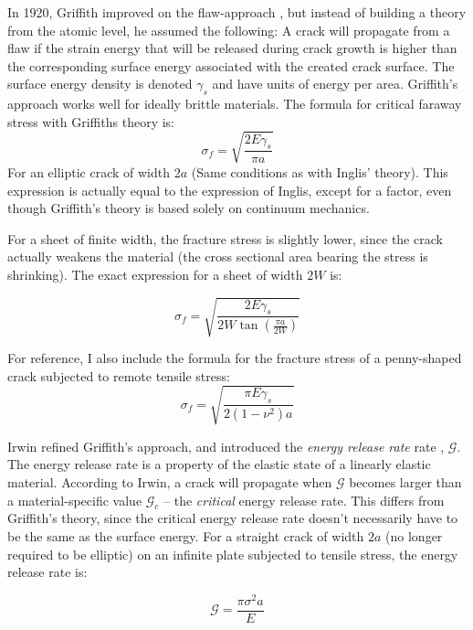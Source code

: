 In 1920, Griffith improved on the flaw-approach \cite{griffith1920phenomena}, but instead of building a theory from the atomic level, he assumed the following: A crack will propagate from a flaw if the strain energy that will be released during crack growth is higher than the corresponding surface energy associated with the created crack surface. The surface energy density is denoted $\gamma_s$ and have units of energy per area. Griffith's approach works well for ideally brittle materials. The formula for critical faraway stress with Griffiths theory is:
\begin{equation}
	\sigma_f = \sqrt{\frac{2E\gamma_s}{\pi a}}
\end{equation}
For an elliptic crack of width $2a$ (Same conditions as with Inglis' theory). This expression is actually equal to the expression of Inglis, except for a factor, even though Griffith's theory is based solely on continuum mechanics.

For a sheet of finite width, the fracture stress is slightly lower, since the crack actually weakens the material (the cross sectional area bearing the stress is shrinking). The exact expression for a sheet of width $2W$ is:

 \begin{equation}
 	\sigma_f = \sqrt{\frac{2E\gamma_s}{2W\tan\left( \frac{\pi a}{2W}\right)}}
 	\label{eq:griffith_finite_sheet}
 \end{equation}

For reference, I also include the formula for the fracture stress of a penny-shaped crack subjected to remote tensile stress:
\begin{equation}
	\sigma_f = \sqrt{\frac{\pi E \gamma_s }{2(1-\nu^2)a}}
\end{equation}
 

 Irwin refined Griffith's approach, and introduced the \emph{energy release rate} rate \cite{irwin2onset}, $\mathcal{G}$. The energy release rate is a property of the elastic state of a linearly elastic material. According to Irwin, a crack will propagate when $\mathcal{G}$ becomes larger than a material-specific value $\mathcal{G}_c$ -- the \emph{critical} energy release rate. This differs from Griffith's theory, since the critical energy release rate doesn't necessarily have to be the same as the surface energy. For a straight crack of width $2a$ (no longer required to be elliptic) on an infinite plate subjected to tensile stress, the energy release rate is:

\begin{equation}
	\mathcal{G} = \frac{\pi \sigma^2 a}{E}
\end{equation}

